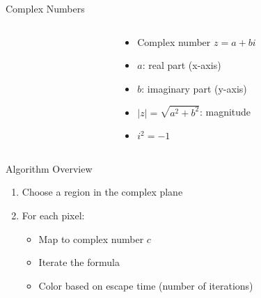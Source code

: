 \documentclass{beamer}
\begin{document}
\begin{frame}{Complex Numbers}
    \begin{columns}
        \begin{column}{0.5\textwidth}
        \end{column}
        \begin{column}{0.45\textwidth}
            \begin{itemize}
                \item Complex number $z = a + bi$
                \item $a$: real part (x-axis)
                \item $b$: imaginary part (y-axis)
                \item $|z| = \sqrt{a^2 + b^2}$: magnitude
                \item $i^2 = -1$
            \end{itemize}
        \end{column}
    \end{columns}
\end{frame}

\begin{frame}[fragile]{Algorithm Overview}
    \begin{enumerate}
        \item Choose a region in the complex plane
        \item For each pixel:
        \begin{itemize}
            \item Map to complex number $c$
            \item Iterate the formula
            \item Color based on escape time (number of iterations)
        \end{itemize}
    \end{enumerate}
\end{frame}
\end{document}
